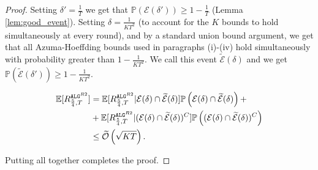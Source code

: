 \begin{proof}
    Setting $\delta'=\frac{1}{T}$ we get that $\mathbb{P}(\mathcal{E}(\delta'))\ge 1-\frac{1}{T}$ (Lemma \ref{lem:good_event}). Setting $\delta=\frac{1}{KT^2}$ (to account for the $K$ bounds to hold simultaneously at every round), and by a standard union bound argument, we get that all Azuma-Hoeffding bounds used in paragraphs (i)-(iv) hold simultaneously with probability greater than $1-\frac{1}{KT^2}$. We call this event $\widetilde{\mathcal{E}}(\delta)$ and we get $\mathbb{P}(\widetilde{\mathcal{E}}(\delta')) \ge 1-\frac{1}{KT^2}$.
    
    \begin{align*}
        \mathbb{E}[R_{\frac{5}{4},T}^{\text{\algrtwo}}] &= \mathbb{E}[R_{\frac{5}{4},T}^{\text{\algrtwo}}|\mathcal{E}(\delta)\cap \widetilde{\mathcal{E}}(\delta)]\mathbb{P}\left(\mathcal{E}(\delta)\cap \widetilde{\mathcal{E}}(\delta)\right) + \\
        \qquad \qquad&+\mathbb{E}[R_{\frac{5}{4},T}^{\text{\algrtwo}}|(\mathcal{E}(\delta)\cap \widetilde{\mathcal{E}}(\delta))^C]\mathbb{P}\left((\mathcal{E}(\delta)\cap \widetilde{\mathcal{E}}(\delta))^C\right) \\
        &\le \widetilde{\mathcal{O}}\left(\sqrt{KT}\right).
    \end{align*}

    Putting all together completes the proof.
\end{proof}
\upperboundlearnrandoms*
